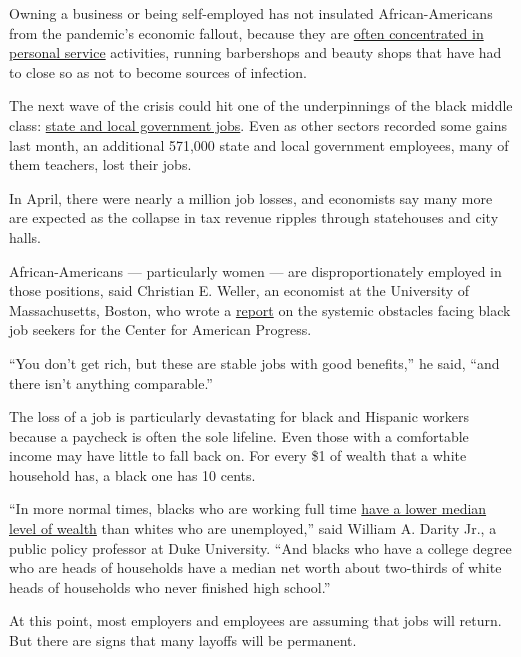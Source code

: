 Owning a business or being self-employed has not insulated
African-Americans from the pandemic's economic fallout, because they are
\href{https://socialequity.duke.edu/wp-content/uploads/2019/10/Entering-Entrepreneurship.pdf}{often
concentrated in personal service} activities, running barbershops and
beauty shops that have had to close so as not to become sources of
infection.

The next wave of the crisis could hit one of the underpinnings of the
black middle class:
\href{https://www.nytimes3xbfgragh.onion/2018/04/22/business/economy/public-employees.html}{state
and local government jobs}. Even as other sectors recorded some gains
last month, an additional 571,000 state and local government employees,
many of them teachers, lost their jobs.

In April, there were nearly a million job losses, and economists say
many more are expected as the collapse in tax revenue ripples through
statehouses and city halls.

African-Americans --- particularly women --- are disproportionately
employed in those positions, said Christian E. Weller, an economist at
the University of Massachusetts, Boston, who wrote a
\href{https://www.americanprogress.org/issues/economy/reports/2019/12/05/478150/african-americans-face-systematic-obstacles-getting-good-jobs/}{report}
on the systemic obstacles facing black job seekers for the Center for
American Progress.

``You don't get rich, but these are stable jobs with good benefits,'' he
said, ``and there isn't anything comparable.''

The loss of a job is particularly devastating for black and Hispanic
workers because a paycheck is often the sole lifeline. Even those with a
comfortable income may have little to fall back on. For every \$1 of
wealth that a white household has, a black one has 10 cents.

``In more normal times, blacks who are working full time
\href{https://socialequity.duke.edu/wp-content/uploads/2020/01/what-we-get-wrong.pdf}{have
a lower median level of wealth} than whites who are unemployed,'' said
William A. Darity Jr., a public policy professor at Duke University.
``And blacks who have a college degree who are heads of households have
a median net worth about two-thirds of white heads of households who
never finished high school.''

At this point, most employers and employees are assuming that jobs will
return. But there are signs that many layoffs will be permanent.

